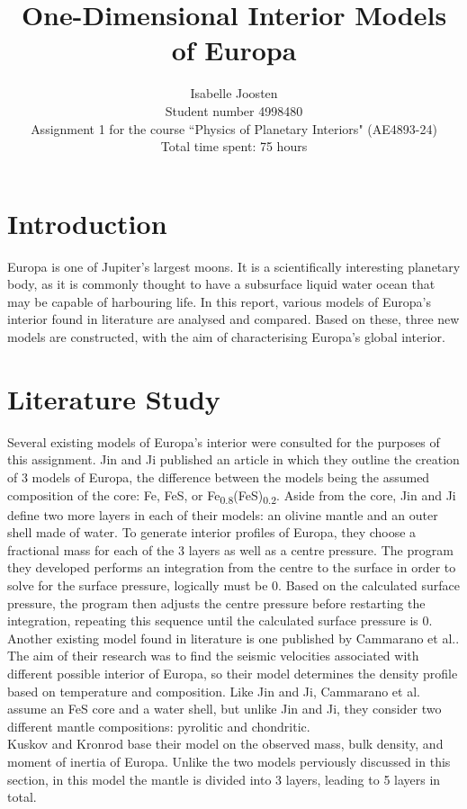 \documentclass[twocolumn]{article}
\title{One-Dimensional Interior Models of Europa}
\author{Isabelle Joosten\\Student number 4998480\\Assignment 1 for the course ``Physics of Planetary Interiors" (AE4893-24)\\Total time spent: 75 hours}
\begin{document}
\maketitle

\section{Introduction}
Europa is one of Jupiter's largest moons. It is a scientifically interesting planetary body, as it is commonly thought to have a subsurface liquid water ocean that may be capable of harbouring life. In this report, various models of Europa's interior found in literature are analysed and compared. Based on these, three new models are constructed, with the aim of characterising Europa's global interior.

\section{Literature Study}
Several existing models of Europa's interior were consulted for the purposes of this assignment. Jin and Ji\cite{jinInternalStructureModels2012} published an article in which they outline the creation of 3 models of Europa, the difference between the models being the assumed composition of the core: Fe, FeS, or Fe\textsubscript{0.8}(FeS)\textsubscript{0.2}. Aside from the core, Jin and Ji define two more layers in each of their models: an olivine mantle and an outer shell made of water. To generate interior profiles of Europa, they choose a fractional mass for each of the 3 layers as well as a centre pressure. The program they developed performs an integration from the centre to the surface in order to solve for the surface pressure, logically must be 0. Based on the calculated surface pressure, the program then adjusts the centre pressure before restarting the integration, repeating this sequence until the calculated surface pressure is 0.\\
\indent Another existing model found in literature is one published by Cammarano et al.\cite{cammaranoLongperiodSeismologyEuropa2006}. The aim of their research was to find the seismic velocities associated with different possible interior of Europa, so their model determines the density profile based on temperature and composition. Like Jin and Ji, Cammarano et al. assume an FeS core and a water shell, but unlike Jin and Ji, they consider two different mantle compositions: pyrolitic and chondritic.\\
\indent Kuskov and Kronrod\cite{kuskovInternalStructureEuropa2005} base their model on the observed mass, bulk density, and moment of inertia of Europa. Unlike the two models perviously discussed in this section, in this model the mantle is divided into 3 layers, leading to 5 layers in total.\\
\end{document}
